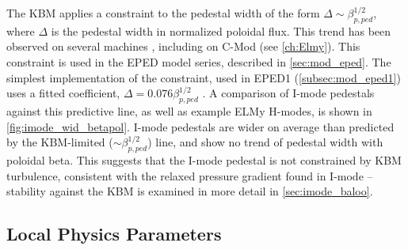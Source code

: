 The KBM applies a constraint to the pedestal width of the form $\Delta \sim \beta_{p,ped}^{1/2}$, where $\Delta$ is the pedestal width in normalized poloidal flux.  This trend has been observed on several machines \cite{Groebner2013,Beurskens2011,Osborne1998}, including on C-Mod (see \cref{ch:Elmy}).  This constraint is used in the EPED model series, described in \cref{sec:mod_eped}.  The simplest implementation of the constraint, used in EPED1 (\cref{subsec:mod_eped1}) uses a fitted coefficient, $\Delta = 0.076 \beta_{p,ped}^{1/2}$ \cite{Snyder2009}.  A comparison of I-mode pedestals against this predictive line, as well as example ELMy H-modes, is shown in \cref{fig:imode_wid_betapol}.  I-mode pedestals are wider on average than predicted by the KBM-limited ($\sim \beta_{p,ped}^{1/2}$) line, and show no trend of pedestal width with poloidal beta.  This suggests that the I-mode pedestal is not constrained by KBM turbulence, consistent with the relaxed pressure gradient found in I-mode -- stability against the KBM is examined in more detail in \cref{sec:imode_baloo}.

\subsection{Local Physics Parameters}\label{subsec:imode_exp_widths}

\begin{figure}[p]
 \pushtooutside
\end{figure}

